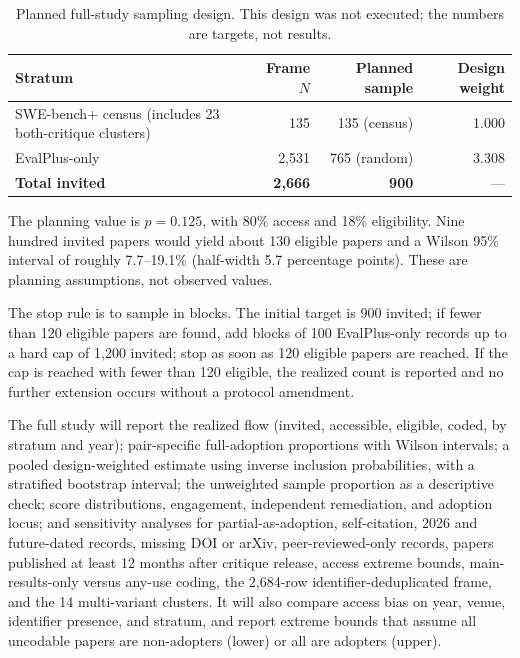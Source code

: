 \documentclass[11pt,a4paper]{article}
\begin{document}
\begin{table}[t]
\centering
\caption{Planned full-study sampling design. This design was not executed; the numbers are targets, not results.}
\label{tab:planned}
\footnotesize
\begin{tabularx}{\textwidth}{@{}X r r r@{}}
\toprule
Stratum & Frame $N$ & Planned sample & Design weight \\
\midrule
SWE-bench+ census (includes 23 both-critique clusters) & 135 & 135 (census) & 1.000 \\
EvalPlus-only & 2,531 & 765 (random) & 3.308 \\
\midrule
\textbf{Total invited} & \textbf{2,666} & \textbf{900} & --- \\
\bottomrule
\end{tabularx}
\end{table}

The planning value is $p = 0.125$, with 80\% access and 18\% eligibility. Nine hundred invited papers would yield about 130 eligible papers and a Wilson 95\% interval of roughly 7.7--19.1\% (half-width 5.7 percentage points). These are planning assumptions, not observed values.

The stop rule is to sample in blocks. The initial target is 900 invited; if fewer than 120 eligible papers are found, add blocks of 100 EvalPlus-only records up to a hard cap of 1,200 invited; stop as soon as 120 eligible papers are reached. If the cap is reached with fewer than 120 eligible, the realized count is reported and no further extension occurs without a protocol amendment.

The full study will report the realized flow (invited, accessible, eligible, coded, by stratum and year); pair-specific full-adoption proportions with Wilson intervals; a pooled design-weighted estimate using inverse inclusion probabilities, with a stratified bootstrap interval; the unweighted sample proportion as a descriptive check; score distributions, engagement, independent remediation, and adoption locus; and sensitivity analyses for partial-as-adoption, self-citation, 2026 and future-dated records, missing DOI or arXiv, peer-reviewed-only records, papers published at least 12 months after critique release, access extreme bounds, main-results-only versus any-use coding, the 2,684-row identifier-deduplicated frame, and the 14 multi-variant clusters. It will also compare access bias on year, venue, identifier presence, and stratum, and report extreme bounds that assume all uncodable papers are non-adopters (lower) or all are adopters (upper).
\end{document}
